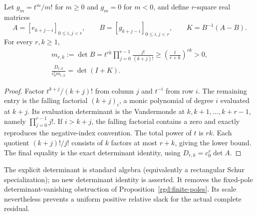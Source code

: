 \begin{proposition}
\label{rgd:gaussian-margin}
Let $g_m=t^m/m!$ for $m\ge0$ and $g_m=0$ for $m<0$, and define
$r$-square real matrices
\[
 A=[e_{k+j-i}]_{0\le i,j<r},\qquad
 B=[g_{k+j-i}]_{0\le i,j<r},\qquad K=B^{-1}(A-B).
\]
For every $r,k\ge1$,
\begin{equation}
 \begin{gathered}
 m_{r,k}:=\det B
   =t^{rk}\prod_{j=0}^{r-1}\frac{j!}{(k+j)!}
   \ge\left(\frac{t}{r+k}\right)^{rk}>0,\\
 \frac{D_{r,k}}{c_0^rm_{r,k}}=\det(I+K).
 \end{gathered}
 \label{rgd:gaussian-margin-equation}
\end{equation}
\end{proposition}
\begin{proof}
Factor $t^{k+j}/(k+j)!$ from column $j$ and $t^{-i}$ from row $i$.
The remaining entry is the falling factorial $(k+j)_i$, a monic
polynomial of degree $i$ evaluated at $k+j$.  Its evaluation determinant
is the Vandermonde at $k,k+1,\ldots,k+r-1$, namely
$\prod_{j=0}^{r-1}j!$.  If $i>k+j$, the falling factorial contains a
zero and exactly reproduces the negative-index convention.  The total
power of $t$ is $rk$.  Each quotient $(k+j)!/j!$ consists of $k$
factors at most $r+k$, giving the lower bound.  The final equality
is the exact determinant identity, using $D_{r,k}=c_0^r\det A$.
\end{proof}

The explicit determinant is standard algebra (equivalently a
rectangular Schur specialization); no new determinant identity is
asserted.  It removes the fixed-pole determinant-vanishing obstruction of
Proposition~\ref{rgd:finite-poles}.  Its scale nevertheless prevents a
uniform positive relative slack for the actual complete residual.

